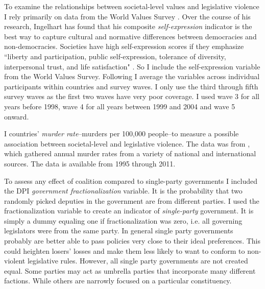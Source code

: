 \documentclass[a4paper]{article}\usepackage[]{graphicx}\usepackage[]{color}
\begin{document}
To examine the relationships between societal-level values and legislative violence I rely primarily on data from the World Values Survey \citeyearpar{WVS2009}. Over the course of his research, Ingelhart has found that his composite {\emph{self-expression}} indicator is the best way to capture cultural and normative differences between democracies and non-democracies. Societies have high self-expression scores if they emphasize ``liberty and participation, public self-expression, tolerance of diversity, interpersonal trust, and life satisfaction" \citep[64]{Inglehart2003}. So I include the self-expression variable from the World Values Survey. Following \cite{Inglehart2003} I average the variables across individual participants within countries and survey waves. I only use the third through fifth survey waves as the first two waves have very poor coverage. I used wave 3 for all years before 1998, wave 4 for all years between 1999 and 2004 and wave 5 onward. 

I countries' \emph{murder rate}--murders per 100,000 people--to measure a possible association between societal-level and legislative violence. The data was from \cite{UNMurder2013}, which gathered annual murder rates from a variety of national and international sources. The data is available from 1995 through 2011.

To assess any effect of coalition compared to single-party governments I included the DPI {\emph{government fractionalization}} variable. It is the probability that two randomly picked deputies in the government are from different parties. I used the fractionalization variable to create an indicator of {\emph{single-party}} government. It is simply a dummy equaling one if fractionalization was zero, i.e. all governing legislators were from the same party. In general single party governments probably are better able to pass policies very close to their ideal preferences. This could heighten losers' losses and make them less likely to want to conform to non-violent legislative rules. However, all single party governments are not created equal. Some parties may act as umbrella parties that incorporate many different factions. While others are narrowly focused on a particular constituency. 
\end{document}
